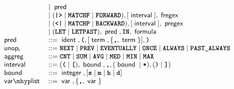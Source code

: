 \begin{figure}
\[\begin{array}{ll}
			                       & \mid \ebnfr{pred}                                                                                                                                                             \\
			                       & \mid (\ebnft{|>} \mid \ebnft{MATCHF} \mid \ebnft{FORWARD}),  [\ebnfr{interval}], \ebnfr{fregex}                                                                               \\
			                       & \mid (\ebnft{<|} \mid \ebnft{MATCHP} \mid \ebnft{BACKWARD}),  [\ebnfr{interval}], \ebnfr{pregex}                                                                              \\
			                       & \mid (\ebnft{LET} \mid \ebnft{LETPAST}), \ebnfr{pred}, \ebnft{IN}, \ebnfr{formula}                                                                                            \\
			\ebnfr{pred}           & ::=       \ebnfr{ident}, \ebnft{(}, [\ebnfr{term}, \{ \ebnft{,}, \ebnfr{term} \}], \ebnft{)}                                                                                  \\
			\ebnfr{unop_i}         & ::=
			\ebnft{NEXT} \mid \ebnft{PREV} \mid \ebnft{EVENTUALLY} \mid \ebnft{ONCE} \mid \ebnft{ALWAYS} \mid \ebnft{PAST\_ALWAYS}                                                                                 \\
			\ebnfr{aggreg}         & ::=
			\ebnft{CNT} \mid \ebnft{SUM} \mid \ebnft{AVG} \mid \ebnft{MED} \mid \ebnft{MIN} \mid \ebnft{MAX}                                                                                                       \\
			\ebnfr{interval}       & ::=
			(\ebnft{(} \mid \ebnft{[}), \ebnfr{bound}, \ebnft{,}, (\ebnfr{bound} \mid \ebnft{*}), (\ebnft{)} \mid \ebnft{]})                                                                                       \\
			\ebnfr{bound}          & ::=
			\ebnfr{integer}, [\ebnft{s} \mid \ebnft{m} \mid \ebnft{h} \mid \ebnft{d}]                                                                                                                              \\
			\ebnfr{var \mhyp list} & ::=
			\ebnfr{var}, \{ \ebnft{,}, \ebnfr{var} \}                                                                                                                                                              \\

\end{array}\]
\end{figure}
